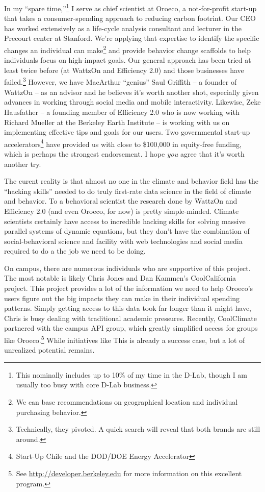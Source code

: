 In my “spare time,”\footnote{This nominally includes up to 10\% of my time in
    the D-Lab, though I am usually too busy with core D-Lab business.} I serve as
chief scientist at Oroeco, a not-for-profit start-up that takes a
consumer-spending approach to reducing carbon footrint.  Our CEO has worked
extensively as a life-cycle analysis consultant and lecturer in the Precourt
center at Stanford. We're applying that expertise to identify the specific
changes an individual can make\footnote{We can base recommendations on
    geographical location and individual purchasing behavior.} and provide
behavior change scaffolds to help individuals focus on high-impact goals. Our
general approach has been tried at least twice before (at WattzOn and Efficiency
2.0) and those businesses have failed.\footnote{Technically, they pivoted. A
    quick search will reveal that both brands are still around.} However, we
have MacArthur “genius” Saul Griffith -- a founder of WattzOn -- as an advisor
and he believes it's worth another shot, especially given advances in working
through social media and mobile interactivity. Likewise, Zeke Hausfather -- a
founding member of Efficiency 2.0 who is now working with Richard Mueller at the
Berkeley Earth Institute -- is working with us on implementing effective tips
and goals for our users. Two governmental start-up
accelerators\footnote{Start-Up Chile and the DOD/DOE Energy Accelerator} have
provided us with close to \$100,000 in equity-free funding, which is perhaps the
strongest endorsement. I hope \emph{you} agree that it's worth another try.

The curent reality is that almost no one in the climate and behavior field has
the “hacking skills” needed to do truly first-rate data science in the field of
climate and behavior. To a behavioral scientist the research done by WattzOn and
Efficiency 2.0 (and even Oroeco, for now) is pretty simple-minded. Climate
scientists certainly have access to incredible hacking skills for solving
massive parallel systems of dynamic equations, but they don't have the
combination of social-behavioral science and facility with web technologies and
social media required to do a the job we need to be doing.

On campus, there are numerous individuals who are supportive of this project.
The most notable is likely Chris Jones and Dan Kammen's CoolCalifornia project.
This project provides a lot of the information we need to help Oroeco's users
figure out the big impacts they can make in their individual spending patterns.
Simply getting access to this data took far longer than it might have, Chris is
busy dealing with traditional academic pressures. Recently, CoolClimate
partnered with the campus API group, which greatly simplified access for groups
like Oroeco.\footnote{See
    \url{http://developer.berkeley.edu} for more information on this excellent
    program.} While initiatives like This is already a success case, but a
lot of unrealized potential remains.

